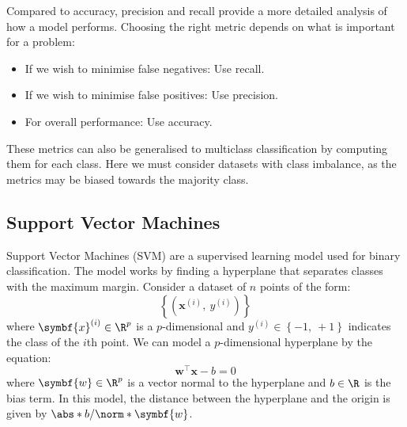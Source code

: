 \documentclass{article}
\begin{document}
Compared to accuracy, precision and recall provide a more detailed
analysis of how a model performs. Choosing the right metric depends on
what is important for a problem:
\begin{itemize}
    \item If we wish to minimise false negatives: Use recall.
    \item If we wish to minimise false positives: Use precision.
    \item For overall performance: Use accuracy.
\end{itemize}
These metrics can also be generalised to multiclass classification by
computing them for each class. Here we must consider datasets with class
imbalance, as the metrics may be biased towards the majority class.
\subsection{Support Vector Machines}
Support Vector Machines (SVM) are a supervised learning model used for
binary classification. The model works by finding a hyperplane that
separates classes with the maximum margin. Consider a dataset of \(n\)
points of the form:
\begin{equation*}
    \left\{ \left( \symbf{x}^{\left( i \right)},\: y^{\left( i \right)} \right) \right\}
\end{equation*}
where \(\symbf{x}^{\left( i \right)} \in \R^p\) is a \(p\)-dimensional
and \(y^{\left( i \right)} \in \left\{ -1,\: {+}1 \right\}\) indicates the
class of the \(i\)th point. We can model a \(p\)-dimensional
hyperplane by the equation:
\begin{equation*}
    \symbf{w}^\top \symbf{x} - b = 0
\end{equation*}
where \(\symbf{w} \in \R^p\) is a vector normal to the hyperplane and
\(b \in \R\) is the bias term. In this model, the distance between the
hyperplane and the origin is given by \(\abs*{b} / \norm*{\symbf{w}}\).
\end{document}
